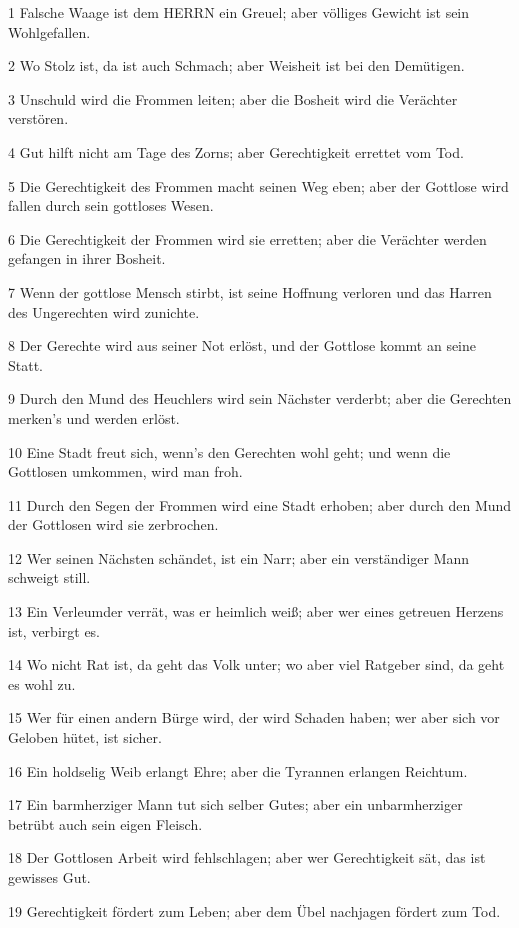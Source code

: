 \par 1 Falsche Waage ist dem HERRN ein Greuel; aber völliges Gewicht ist sein Wohlgefallen.
\par 2 Wo Stolz ist, da ist auch Schmach; aber Weisheit ist bei den Demütigen.
\par 3 Unschuld wird die Frommen leiten; aber die Bosheit wird die Verächter verstören.
\par 4 Gut hilft nicht am Tage des Zorns; aber Gerechtigkeit errettet vom Tod.
\par 5 Die Gerechtigkeit des Frommen macht seinen Weg eben; aber der Gottlose wird fallen durch sein gottloses Wesen.
\par 6 Die Gerechtigkeit der Frommen wird sie erretten; aber die Verächter werden gefangen in ihrer Bosheit.
\par 7 Wenn der gottlose Mensch stirbt, ist seine Hoffnung verloren und das Harren des Ungerechten wird zunichte.
\par 8 Der Gerechte wird aus seiner Not erlöst, und der Gottlose kommt an seine Statt.
\par 9 Durch den Mund des Heuchlers wird sein Nächster verderbt; aber die Gerechten merken's und werden erlöst.
\par 10 Eine Stadt freut sich, wenn's den Gerechten wohl geht; und wenn die Gottlosen umkommen, wird man froh.
\par 11 Durch den Segen der Frommen wird eine Stadt erhoben; aber durch den Mund der Gottlosen wird sie zerbrochen.
\par 12 Wer seinen Nächsten schändet, ist ein Narr; aber ein verständiger Mann schweigt still.
\par 13 Ein Verleumder verrät, was er heimlich weiß; aber wer eines getreuen Herzens ist, verbirgt es.
\par 14 Wo nicht Rat ist, da geht das Volk unter; wo aber viel Ratgeber sind, da geht es wohl zu.
\par 15 Wer für einen andern Bürge wird, der wird Schaden haben; wer aber sich vor Geloben hütet, ist sicher.
\par 16 Ein holdselig Weib erlangt Ehre; aber die Tyrannen erlangen Reichtum.
\par 17 Ein barmherziger Mann tut sich selber Gutes; aber ein unbarmherziger betrübt auch sein eigen Fleisch.
\par 18 Der Gottlosen Arbeit wird fehlschlagen; aber wer Gerechtigkeit sät, das ist gewisses Gut.
\par 19 Gerechtigkeit fördert zum Leben; aber dem Übel nachjagen fördert zum Tod.
